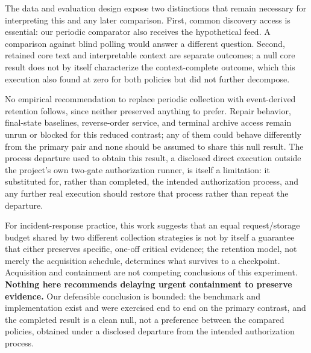 \documentclass[11pt]{article}
\begin{document}
The data and evaluation design expose two distinctions that remain necessary for interpreting this and any later comparison. First, common discovery access is essential: our periodic comparator also receives the hypothetical feed. A comparison against blind polling would answer a different question. Second, retained core text and interpretable context are separate outcomes; a null core result does not by itself characterize the context-complete outcome, which this execution also found at zero for both policies but did not further decompose.

No empirical recommendation to replace periodic collection with event-derived retention follows, since neither preserved anything to prefer. Repair behavior, final-state baselines, reverse-order service, and terminal archive access remain unrun or blocked for this reduced contrast; any of them could behave differently from the primary pair and none should be assumed to share this null result. The process departure used to obtain this result, a disclosed direct execution outside the project's own two-gate authorization runner, is itself a limitation: it substituted for, rather than completed, the intended authorization process, and any further real execution should restore that process rather than repeat the departure.

For incident-response practice, this work suggests that an equal request/storage budget shared by two different collection strategies is not by itself a guarantee that either preserves specific, one-off critical evidence; the retention model, not merely the acquisition schedule, determines what survives to a checkpoint. Acquisition and containment are not competing conclusions of this experiment. \textbf{Nothing here recommends delaying urgent containment to preserve evidence.} Our defensible conclusion is bounded: the benchmark and implementation exist and were exercised end to end on the primary contrast, and the completed result is a clean null, not a preference between the compared policies, obtained under a disclosed departure from the intended authorization process.

\label{main-end}
\end{document}
